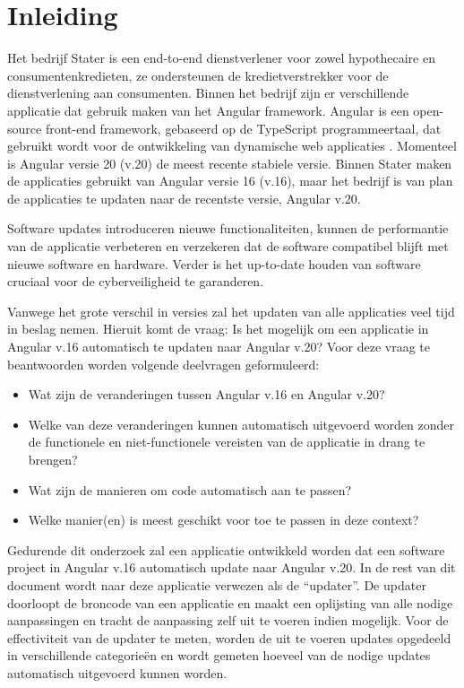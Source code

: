 
\section{Inleiding}
\label{sec:inleiding}

Het bedrijf Stater is een end-to-end dienstverlener voor zowel hypothecaire en consumentenkredieten, ze ondersteunen de kredietverstrekker voor de dienstverlening aan consumenten.
Binnen het bedrijf zijn er verschillende applicatie dat gebruik maken van het Angular framework.
Angular is een open-source front-end framework, gebaseerd op de TypeScript programmeertaal, dat gebruikt wordt voor de ontwikkeling van dynamische web applicaties \autocite{Cincovic2019}.
Momenteel is Angular versie 20 (v.20) de meest recente stabiele versie.
Binnen Stater maken de applicaties gebruikt van Angular versie 16 (v.16), maar het bedrijf is van plan de applicaties te updaten naar de recentste versie, Angular v.20.

Software updates introduceren nieuwe functionaliteiten, kunnen de performantie van de applicatie verbeteren en verzekeren dat de software compatibel blijft met nieuwe software en hardware.
Verder is het up-to-date houden van software cruciaal voor de cyberveiligheid te garanderen.

Vanwege het grote verschil in versies zal het updaten van alle applicaties veel tijd in beslag nemen.
Hieruit komt de vraag: Is het mogelijk om een applicatie in Angular v.16 automatisch te updaten naar Angular v.20?
Voor deze vraag te beantwoorden worden volgende deelvragen geformuleerd:
\begin{itemize}
  \item Wat zijn de veranderingen tussen Angular v.16 en Angular v.20?
  \item Welke van deze veranderingen kunnen automatisch uitgevoerd worden zonder de functionele en niet-functionele vereisten van de applicatie in drang te brengen?
  \item Wat zijn de manieren om code automatisch aan te passen?
  \item Welke manier(en) is meest geschikt voor toe te passen in deze context?
\end{itemize}

Gedurende dit onderzoek zal een applicatie ontwikkeld worden dat een software project in Angular v.16 automatisch update naar Angular v.20.
In de rest van dit document wordt naar deze applicatie verwezen als de ``updater''.
De updater doorloopt de broncode van een applicatie en maakt een oplijsting van alle nodige aanpassingen en tracht de aanpassing zelf uit te voeren indien mogelijk.
Voor de effectiviteit van de updater te meten, worden de uit te voeren updates opgedeeld in verschillende categorieën en wordt gemeten hoeveel van de nodige updates automatisch uitgevoerd kunnen worden.

